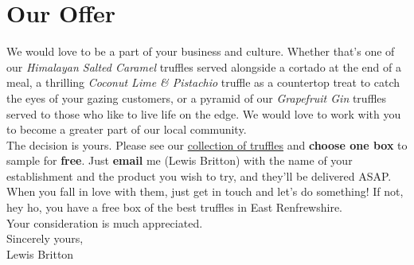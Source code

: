 \documentclass[11pt, english]{article}
\begin{document}
\section{Our Offer}

\footnotesize We would love to be a part of your business and culture. Whether that's one of our \textit{Himalayan Salted Caramel} truffles served alongside a cortado at the end of a meal, a thrilling \textit{Coconut Lime \& Pistachio} truffle as a countertop treat to catch the eyes of your gazing customers, or a pyramid of our \textit{Grapefruit Gin} truffles served to those who like to live life on the edge. We would love to work with you to become a greater part of our local community.\\

The decision is yours. Please see our \href{http://vtctruffles.co.uk/Truffles.html}{collection of truffles} and \textbf{choose one box} to sample for \textbf{free}. Just \textbf{email} me (Lewis Britton) with the name of your establishment and the product you wish to try, and they'll be delivered ASAP. When you fall in love with them, just get in touch and let's do something! If not, hey ho, you have a free box of the best truffles in East Renfrewshire.\\

Your consideration is much appreciated.\\

Sincerely yours,\\
Lewis Britton
\end{document}
